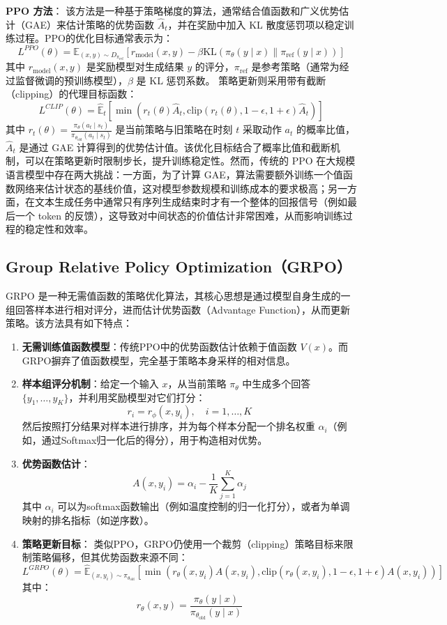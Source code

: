 \documentclass{pkuthesis}
\begin{document}
\textbf{PPO 方法}： 该方法是一种基于策略梯度的算法，通常结合值函数和广义优势估计（GAE）来估计策略的优势函数 $\hat{A}_t$，并在奖励中加入 KL 散度惩罚项以稳定训练过程。PPO的优化目标通常表示为：
$$L^{PPO}(\theta) = \mathbb{E}_{(x,y) \sim D_{\pi_{\text{ref}}}} \left[ r_{\text{model}}(x, y) - \beta \text{KL}(\pi_{\theta}(y \mid x) \| \pi_{\text{ref}}(y \mid x)) \right]$$
其中 $r_{\text{model}}(x, y)$ 是奖励模型对生成结果 $y$ 的评分，$\pi_{\text{ref}}$ 是参考策略（通常为经过监督微调的预训练模型），$\beta$ 是 KL 惩罚系数。
策略更新则采用带有截断（clipping）的代理目标函数：
$$ L^{CLIP}(\theta) = \hat{\mathbb{E}}_t \left[ \min(r_t(\theta)\hat{A}_t, \text{clip}(r_t(\theta), 1-\epsilon, 1+\epsilon)\hat{A}_t) \right] $$
其中 $r_t(\theta) = \frac{\pi_{\theta}(a_t \mid s_t)}{\pi_{\theta_{\text{old}}}(a_t \mid s_t)}$ 是当前策略与旧策略在时刻 $t$ 采取动作 $a_t$ 的概率比值，$\hat{A}_t$ 是通过 GAE 计算得到的优势估计值。该优化目标结合了概率比值和截断机制，可以在策略更新时限制步长，提升训练稳定性。然而，传统的 PPO 在大规模语言模型中存在两大挑战：一方面，为了计算 GAE，算法需要额外训练一个值函数网络来估计状态的基线价值，这对模型参数规模和训练成本的要求极高；另一方面，在文本生成任务中通常只有序列生成结束时才有一个整体的回报信号（例如最后一个 token 的反馈），这导致对中间状态的价值估计非常困难，从而影响训练过程的稳定性和效率。



\subsection{Group Relative Policy Optimization（GRPO）}
GRPO 是一种无需值函数的策略优化算法，其核心思想是通过模型自身生成的一组回答样本进行相对评分，进而估计优势函数（Advantage Function），从而更新策略。该方法具有如下特点：
\begin{enumerate}
    \item \textbf{无需训练值函数模型}：传统PPO中的优势函数估计依赖于值函数 $V(x)$。而GRPO摒弃了值函数模型，完全基于策略本身采样的相对信息。
    \item \textbf{样本组评分机制}：给定一个输入 $x$，从当前策略 $\pi_{\theta}$ 中生成多个回答 $\{y_1, \dots, y_K\}$，并利用奖励模型对它们打分：
    $$ r_i = r_{\phi}(x, y_i), \quad i = 1, \dots, K $$
    然后按照打分结果对样本进行排序，并为每个样本分配一个排名权重 $\alpha_i$（例如，通过Softmax归一化后的得分），用于构造相对优势。
    \item \textbf{优势函数估计}：
    $$ A(x, y_i) = \alpha_i - \frac{1}{K} \sum_{j=1}^K \alpha_j $$
    其中 $\alpha_i$ 可以为softmax函数输出（例如温度控制的归一化打分），或者为单调映射的排名指标（如逆序数）。
    \item \textbf{策略更新目标}：
    类似PPO，GRPO仍使用一个裁剪（clipping）策略目标来限制策略偏移，但其优势函数来源不同：
    $$ L^{GRPO}(\theta) = \hat{\mathbb{E}}_{(x,y_i) \sim \pi_{\theta_{\text{old}}}} \left[ \min(r_{\theta}(x,y_i)A(x,y_i), \text{clip}(r_{\theta}(x,y_i), 1-\epsilon, 1+\epsilon)A(x,y_i)) \right] $$
    其中：
    $$ r_{\theta}(x, y) = \frac{\pi_{\theta}(y \mid x)}{\pi_{\theta_{\text{old}}}(y \mid x)} $$
\end{enumerate}
\end{document}
